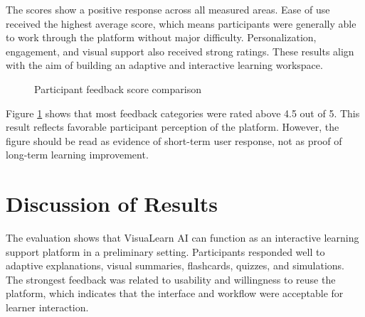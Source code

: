 The scores show a positive response across all measured areas. Ease of use received the highest average score, which means participants were generally able to work through the platform without major difficulty. Personalization, engagement, and visual support also received strong ratings. These results align with the aim of building an adaptive and interactive learning workspace.

\begin{figure}[H]
\centering
{}
\caption{Participant feedback score comparison}
\label{fig:feedback-graph}
\end{figure}

Figure \ref{fig:feedback-graph} shows that most feedback categories were rated above 4.5 out of 5. This result reflects favorable participant perception of the platform. However, the figure should be read as evidence of short-term user response, not as proof of long-term learning improvement.

\section[Discussion of Results]{\textbf{Discussion of Results}}
The evaluation shows that VisuaLearn AI can function as an interactive learning support platform in a preliminary setting. Participants responded well to adaptive explanations, visual summaries, flashcards, quizzes, and simulations. The strongest feedback was related to usability and willingness to reuse the platform, which indicates that the interface and workflow were acceptable for learner interaction.

